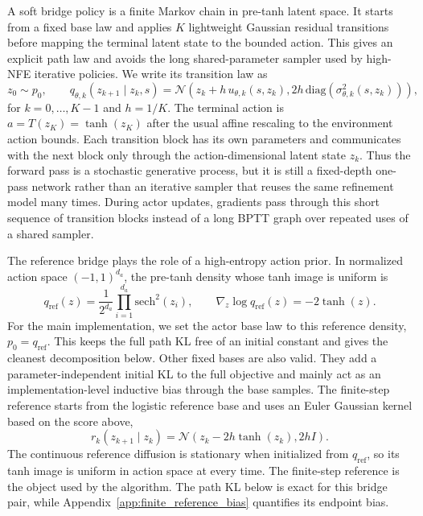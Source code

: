 \documentclass[11pt]{article}
\begin{document}
A soft bridge policy is a finite Markov chain in pre-tanh latent space. It starts from a fixed base law and applies $K$ lightweight Gaussian residual transitions before mapping the terminal latent state to the bounded action. This gives an explicit path law and avoids the long shared-parameter sampler used by high-NFE iterative policies. We write its transition law as
\begin{equation}
  z_0\sim p_0,
  \qquad
  q_{\theta,k}(z_{k+1}\mid z_k,s)
  =
  \mathcal N
  \left(
    z_k+h\,u_{\theta,k}(s,z_k),
    2h\,\mathrm{diag}(\sigma_{\theta,k}^2(s,z_k))
  \right),
  \label{eq:bridge_actor_kernel}
\end{equation}
for $k=0,\ldots,K-1$ and $h=1/K$. The terminal action is $a=T(z_K)=\tanh(z_K)$ after the usual affine rescaling to the environment action bounds. Each transition block has its own parameters and communicates with the next block only through the action-dimensional latent state $z_k$. Thus the forward pass is a stochastic generative process, but it is still a fixed-depth one-pass network rather than an iterative sampler that reuses the same refinement model many times. During actor updates, gradients pass through this short sequence of transition blocks instead of a long BPTT graph over repeated uses of a shared sampler.

The reference bridge plays the role of a high-entropy action prior. In normalized action space $(-1,1)^{d_a}$, the pre-tanh density whose tanh image is uniform is
\begin{equation}
  q_{\mathrm{ref}}(z)
  =
  \frac{1}{2^{d_a}}
  \prod_{i=1}^{d_a}
  \mathrm{sech}^2(z_i),
  \qquad
  \nabla_z\log q_{\mathrm{ref}}(z)
  =
  -2\tanh(z).
\end{equation}
For the main implementation, we set the actor base law to this reference density, $p_0=q_{\mathrm{ref}}$. This keeps the full path KL free of an initial constant and gives the cleanest decomposition below. Other fixed bases are also valid. They add a parameter-independent initial KL to the full objective and mainly act as an implementation-level inductive bias through the base samples. The finite-step reference starts from the logistic reference base and uses an Euler Gaussian kernel based on the score above,
\begin{equation}
  r_k(z_{k+1}\mid z_k)
  =
  \mathcal N
  \left(
    z_k-2h\tanh(z_k),
    2hI
  \right).
  \label{eq:bridge_reference_kernel}
\end{equation}
The continuous reference diffusion is stationary when initialized from $q_{\mathrm{ref}}$, so its tanh image is uniform in action space at every time. The finite-step reference is the object used by the algorithm. The path KL below is exact for this bridge pair, while Appendix~\ref{app:finite_reference_bias} quantifies its endpoint bias.
\end{document}
